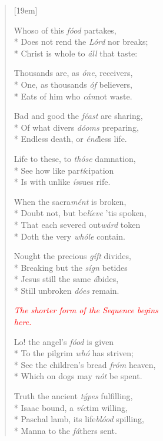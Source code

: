 \documentclass[12pt]{memoir}
\begin{document}
\begin{multicols}{2}
\begin{verse}[19em]

Whoso of this \textit{f\'{o}od} partakes, \\*
Does not rend the \textit{L\'{o}rd} nor breaks; \\*
Christ is whole to \textit{\'{a}ll} that taste:

Thousands are, as \textit{\'{o}ne}, receivers, \\*
One, as thousands \textit{\'{o}f} believers, \\*
Eats of him who \textit{c\'{a}n}not waste.

Bad and good the \textit{f\'{e}ast} are sharing, \\*
Of what divers \textit{d\'{o}oms} preparing, \\*
Endless death, or \textit{\'{e}nd}less life.

Life to these, to \textit{th\'{o}se} damnation, \\*
See how like par\textit{t\'{i}}cipation \\*
Is with unlike \textit{\'{i}s}sues rife.

When the sacra\textit{m\'{e}nt} is broken, \\*
Doubt not, but be\textit{l\'{i}eve} 'tis spoken, \\*
That each severed out\textit{w\'{a}rd} token \\*
Doth the very \textit{wh\'{o}le} contain.

Nought the precious \textit{g\'{i}ft} divides, \\*
Breaking but the \textit{s\'{i}gn} betides \\*
Jesus still the same \textit{\'{a}}bides, \\*
Still unbroken \textit{d\'{o}es} remain.

\columnbreak

\textcolor{red}{\textit{The shorter form of the Sequence begins \\ here.}}

Lo! the angel's \textit{f\'{o}od} is given \\*
To the pilgrim \textit{wh\'{o}} has striven; \\*
See the children's bread \textit{fr\'{o}m} heaven, \\*
Which on dogs may \textit{n\'{o}t} be spent.

Truth the ancient \textit{t\'{y}pes} fulfilling, \\*
Isaac bound, a \textit{v\'{i}c}tim willing, \\*
Paschal lamb, its life\textit{bl\'{o}od} spilling, \\*
Manna to the \textit{f\'{a}}thers sent.


\end{verse}
\end{multicols}
\end{document}
